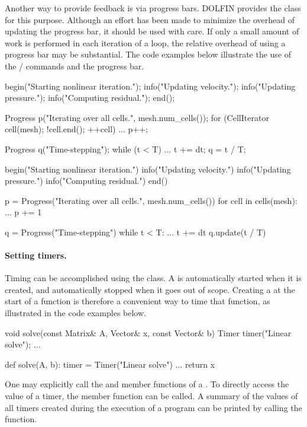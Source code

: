 Another way to provide feedback is via progress bars. DOLFIN provides
the  class for this purpose. Although an effort has been
made to minimize the overhead of updating the progress bar, it should
be used with care. If only a small amount of work is performed in each
iteration of a loop, the relative overhead of using a progress bar
may be substantial. The code examples below illustrate the use of the
/ commands and the progress bar.
\begin{c++}
begin("Starting nonlinear iteration.");
info("Updating velocity.");
info("Updating pressure.");
info("Computing residual.");
end();

Progress p("Iterating over all cells.", mesh.num_cells());
for (CellIterator cell(mesh); !cell.end(); ++cell)
{
  ...
  p++;
}

Progress q("Time-stepping");
while (t < T)
{
  ...
  t += dt;
  q = t / T;
}
\end{c++}
\begin{python}
begin("Starting nonlinear iteration.")
info("Updating velocity.")
info("Updating pressure.")
info("Computing residual.")
end()

p = Progress("Iterating over all cells.", mesh.num_cells())
for cell in cells(mesh):
  ...
  p += 1

q = Progress("Time-stepping")
while t < T:
  ...
  t += dt
  q.update(t / T)
\end{python}

\paragraph{Setting timers.}

Timing can be accomplished using the  class. A  is
automatically started when it is created, and automatically stopped when
it goes out of scope. Creating a  at the start of a function
is therefore a convenient way to time that function, as illustrated in
the code examples below.
\begin{c++}
void solve(const Matrix& A, Vector& x, const Vector& b)
{
  Timer timer("Linear solve");
  ...
}
\end{c++}
\begin{python}
def solve(A, b):
  timer = Timer("Linear solve")
  ...
  return x
\end{python}
One may explicitly call the  and  member
functions of a . To directly access the value of a timer,
the  member function can be called. A summary of the
values of all timers created during the execution of a program can be
printed by calling the  function.

